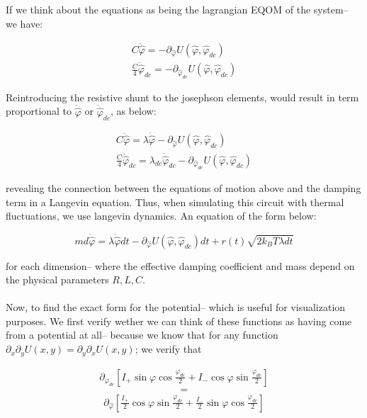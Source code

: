\documentclass[paper=a4, twocolumn, fontsize=10pt]{article} %
\numberwithin{equation}{section} %
\numberwithin{figure}{section} %
\numberwithin{table}{section} %
\def \df#1{\hat{#1}}
\def \dl#1{#1}
\begin{document}
If we think about the equations as being the lagrangian EQOM of the system-- we have:

\begin{align}
C \ddot{\df\varphi} =- \partial_{\df\varphi} U(\df\varphi, \df\varphi_{dc})
\\
\frac{C}{4} \ddot{\df\varphi}_{dc} =  - \partial_{\df\varphi_{dc}} U(\df\varphi, \df\varphi_{dc})
\end{align}


Reintroducing the resistive shunt to the josephson elements, would result in term proportional to $\dot{\df\varphi}$ or $\dot{\df\varphi}_{dc}$, as below:

\begin{align}
C \ddot{\df\varphi} = \lambda \dot{\df\varphi} - \partial_{\df\varphi} U(\df\varphi, \df\varphi_{dc})
\\
\frac{C}{4} \ddot{\df\varphi}_{dc} = \lambda_{dc} \dot{\df\varphi}_{dc} - \partial_{\df\varphi_{dc}} U(\df\varphi, \df\varphi_{dc})
\end{align}

revealing the connection between the equations of motion above and the damping term in a Langevin equation. Thus, when simulating this circuit with thermal fluctuations, we use langevin dynamics. An equation of the form below:

\[ m d \dot{\df\varphi} = \lambda \dot{\df\varphi} dt - \partial_{\df\varphi} U(\df\varphi, \df\varphi_{dc}) dt + r(t) \sqrt{2 k_B T \lambda dt} \]

for each dimension-- where the effective damping coefficient and mass depend on the physical parameters $R,L,C$.
\\
\\
Now, to find the exact form for the potential-- which is useful for visualization purposes. We first verify wether we can think of these functions as having come from a potential at all-- because we know that for any function $\partial_{x} \partial_{y} U(x,y) = \partial_{y} \partial_{x} U(x,y)$; we verify that

\begin{align}
 \partial_{\df\varphi_{dc}}\left[I_{+} \sin \dl\varphi \cos \frac{\dl\varphi_{dc}}{2} + I_{-} \cos \dl\varphi \sin \frac{\dl\varphi_{dc}}{2}\right]
\end{align}
\[=\]
\begin{align} 
    \partial_{\df\varphi}\left[\frac{I_{+}}{2} \cos \dl\varphi \sin \frac{\dl\varphi_{dc}}{2} + \frac{I_{-}}{2} \sin \dl\varphi \cos \frac{\dl\varphi_{dc}}{2}\right]
\end{align}
\end{document}
